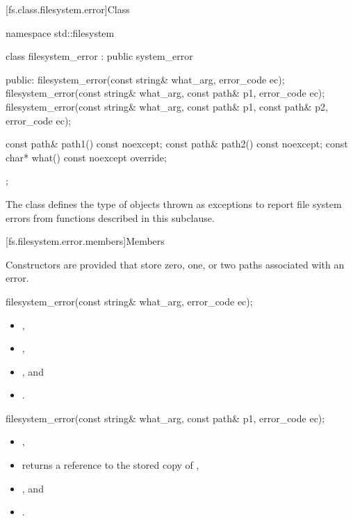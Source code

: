[fs.class.filesystem.error]{Class }

%
\begin{codeblock}
namespace std::filesystem {
  class filesystem_error : public system_error {
  public:
    filesystem_error(const string& what_arg, error_code ec);
    filesystem_error(const string& what_arg,
                     const path& p1, error_code ec);
    filesystem_error(const string& what_arg,
                     const path& p1, const path& p2, error_code ec);

    const path& path1() const noexcept;
    const path& path2() const noexcept;
    const char* what() const noexcept override;
  };
}
\end{codeblock}
\pnum
The class  defines the type of
objects thrown as exceptions to report file system errors from functions described in this
subclause.

[fs.filesystem.error.members]{Members}

\pnum
 Constructors are provided that store zero, one, or two paths associated with
an error.

%
\begin{itemdecl}
filesystem_error(const string& what_arg, error_code ec);
\end{itemdecl}

\begin{itemdescr}
\pnum
\ensures
\begin{itemize}
\item {},
\item {},
\item {}, and
\item {} .
\end{itemize}
\end{itemdescr}

%
\begin{itemdecl}
filesystem_error(const string& what_arg, const path& p1, error_code ec);
\end{itemdecl}

\begin{itemdescr}
\pnum
\ensures
\begin{itemize}
\item {},
\item {} returns a reference to the stored copy of ,
\item {}, and
\item {} .
\end{itemize}
\end{itemdescr}

